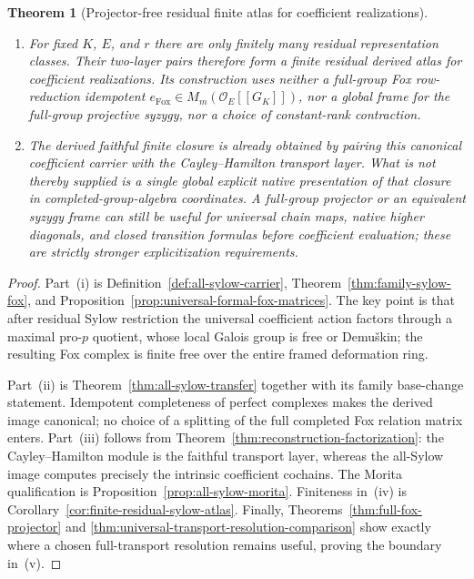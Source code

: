 \documentclass[11pt]{article}
\newtheorem{theorem}{Theorem}[section]
\theoremstyle{definition}
\begin{document}
\begin{theorem}[Projector-free residual finite atlas for coefficient realizations]
\begin{enumerate}[label=\textnormal{(\roman*)}]
\item For fixed $K$, $E$, and $r$ there are only finitely many residual
representation classes.  Their two-layer pairs therefore form a finite
residual derived atlas for coefficient realizations.  Its construction uses
neither a full-group Fox row-reduction idempotent
$e_{\mathrm{Fox}}\in M_m(\mathcal O_E[[G_K]])$, nor a global frame for the
full-group projective syzygy, nor a choice of constant-rank contraction.

\item The derived faithful finite closure is already obtained by pairing this
canonical coefficient carrier with the Cayley--Hamilton transport layer.  What is
not thereby supplied is a single global \emph{explicit native presentation} of that
closure in completed-group-algebra coordinates.  A full-group projector or an
equivalent syzygy frame can still be useful for universal chain maps, native higher
diagonals, and closed transition formulas before coefficient evaluation; these are
strictly stronger explicitization requirements.
\end{enumerate}
\end{theorem}

\begin{proof}
Part~(i) is Definition~\ref{def:all-sylow-carrier},
Theorem~\ref{thm:family-sylow-fox}, and
Proposition~\ref{prop:universal-formal-fox-matrices}.  The key point is that
after residual Sylow restriction the universal coefficient action factors
through a maximal pro-$p$ quotient, whose local Galois group is free or
Demu\v{s}kin; the resulting Fox complex is finite free over the entire framed
deformation ring.

Part~(ii) is Theorem~\ref{thm:all-sylow-transfer} together with its family
base-change statement.  Idempotent completeness of perfect complexes makes
the derived image canonical; no choice of a splitting of the full completed
Fox relation matrix enters.  Part~(iii) follows from
Theorem~\ref{thm:reconstruction-factorization}: the Cayley--Hamilton module is
the faithful transport layer, whereas the all-Sylow image computes precisely
the intrinsic coefficient cochains.  The Morita qualification is
Proposition~\ref{prop:all-sylow-morita}.  Finiteness in~(iv) is
Corollary~\ref{cor:finite-residual-sylow-atlas}.  Finally,
Theorems~\ref{thm:full-fox-projector} and
\ref{thm:universal-transport-resolution-comparison} show exactly where a
chosen full-transport resolution remains useful, proving the boundary in~(v).
\end{proof}
\end{document}
